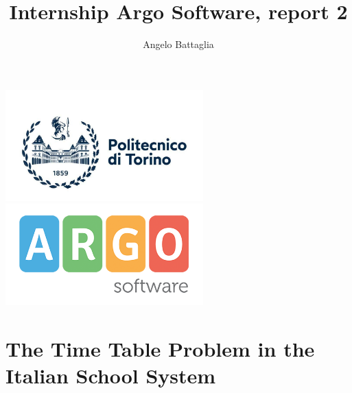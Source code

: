 \documentclass{article}
\author{Angelo Battaglia}
\title{Internship Argo Software, report 2}
\begin{document}
\maketitle

\begin{center}
\includegraphics[width=3in]{./images/polito.jpg}
\includegraphics[width=3in]{./images/og_logoargosoft.png}
\end{center}

\section{The Time Table Problem in the Italian School System}




\printbibliography[title = {Bibliography}]
\end{document}
